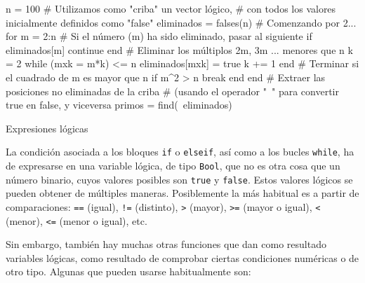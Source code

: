 ﻿\documentclass{article}
\newcommand{\jl}{\texttt}
\begin{document}
n = 100
# Utilizamos como "criba" un vector lógico,
# con todos los valores inicialmente definidos como "false"
eliminados = falses(n)
# Comenzando por 2...
for m = 2:n
  # Si el número (m) ha sido eliminado, pasar al siguiente
  if eliminados[m]
    continue
  end
  # Eliminar los múltiplos 2m, 3m ... menores que n
  k = 2
  while (mxk = m*k) <= n
    eliminados[mxk] = true
    k += 1
  end
  # Terminar si el cuadrado de m es mayor que n 
  if m^2 > n
    break
  end
end
# Extraer las posiciones no eliminadas de la criba
# (usando el operador "~" para convertir true en false, y viceversa
primos = find(~eliminados)


Expresiones lógicas

La condición asociada a los bloques \jl{if} o \jl{elseif}, así como a los bucles \jl{while}, ha de expresarse en una variable lógica, de tipo \jl{Bool}, que no es otra cosa que un número binario, cuyos valores posibles son \jl{true} y \jl{false}. Estos valores lógicos se pueden obtener de múltiples maneras. Posiblemente la más habitual es a partir de comparaciones:
\jl{==} (igual), \jl{!=} (distinto),
\jl{>} (mayor), \jl{>=} (mayor o igual),
\jl{<} (menor), \jl{<=} (menor o igual), etc.

Sin embargo, también hay muchas otras funciones que dan como resultado variables lógicas, como resultado de comprobar ciertas condiciones numéricas o de otro tipo. Algunas que pueden usarse habitualmente son:
\end{document}
